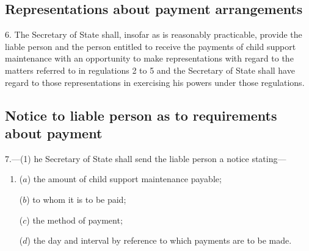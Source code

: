 \documentclass[12pt,a4paper]{article}
\begin{document}
\subsection[6. Representations about payment arrangements]{Representations about payment arrangements}

6.  The Secretary of State shall, insofar as is reasonably practicable, provide the liable person and the person entitled to receive the payments of child support maintenance with an opportunity to make representations with regard to the matters referred to in regulations 2 to 5 and the Secretary of State shall have regard to those representations in exercising his powers under those regulations.

\subsection[7. Notice to liable person as to requirements about payment]{Notice to liable person as to requirements about payment}

7.—(1) 
he  %
Secretary of State shall send the liable person a notice stating—
\begin{enumerate}\item[]
($a$) the amount of child support maintenance payable;

($b$) to whom it is to be paid;

($c$) the method of payment; 

($d$) the day and interval by reference to which payments are to be made.
\end{enumerate}

\end{document}
